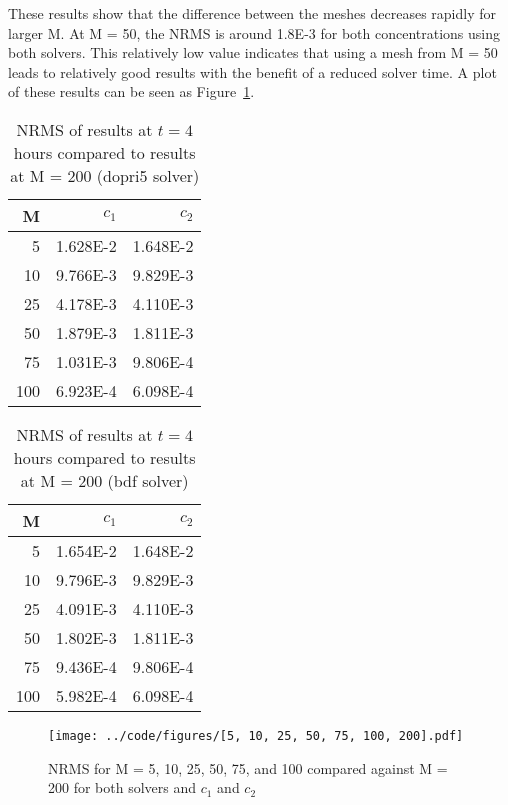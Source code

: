 \documentclass[twocolumn,10pt]{asme2ej}
\begin{document}
These results show that the difference between the meshes decreases rapidly for larger M. At M = 50, the NRMS is around 1.8E-3 for both concentrations using both solvers. This relatively low value indicates that using a mesh from M = 50 leads to relatively good results with the benefit of a reduced solver time. A plot of these results can be seen as Figure~\ref{NRMS_plot}.


\begin{table}[tb]
\begin{center}
\begin{tabular}{| r | r r |}
\hline
M & $c_{1}$ & $c_{2}$ \\
\hline
  5 & 1.628E-2 & 1.648E-2 \\
 10 & 9.766E-3 & 9.829E-3 \\
 25 & 4.178E-3 & 4.110E-3 \\
 50 & 1.879E-3 & 1.811E-3 \\
 75 & 1.031E-3 & 9.806E-4 \\
100 & 6.923E-4 & 6.098E-4 \\
\hline
\end{tabular}
\caption{NRMS of results at $t=4$ hours compared to results at M = 200 (dopri5 solver)}
\label{dopri5_nrms_table}
\end{center}
\end{table}

\begin{table}[tb]
\begin{center}
\begin{tabular}{| r | r r |}
\hline
M & $c_{1}$ & $c_{2}$ \\
\hline
  5 & 1.654E-2 & 1.648E-2 \\
 10 & 9.796E-3 & 9.829E-3 \\
 25 & 4.091E-3 & 4.110E-3 \\
 50 & 1.802E-3 & 1.811E-3 \\
 75 & 9.436E-4 & 9.806E-4 \\
100 & 5.982E-4 & 6.098E-4 \\
\hline
\end{tabular}
\caption{NRMS of results at $t=4$ hours compared to results at M = 200 (bdf solver)}
\label{bdf_nrms_table}
\end{center}
\end{table}

\begin{figure}[tb]
\begin{center}
\texttt{[image: ../code/figures/[5, 10, 25, 50, 75, 100, 200].pdf]}
\caption{NRMS for M = 5, 10, 25, 50, 75, and 100 compared against M = 200 for both solvers and $c_1$ and $c_2$}
\label{NRMS_plot}
\end{center}
\end{figure}
\end{document}
